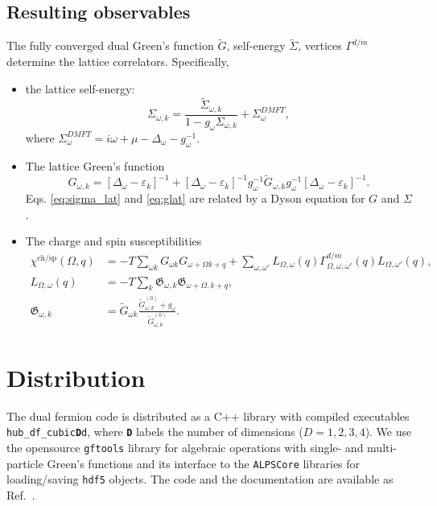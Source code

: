 \documentclass[3p,times,procedia]{elsarticle}
\begin{document}
\subsection{Resulting observables}
The fully converged dual Green's function $\tilde G$, self-energy $\tilde \Sigma$, vertices $\Gamma^{d/m}$ determine the lattice correlators. Specifically, 
\begin{itemize}
\item the lattice self-energy: 
\begin{equation}\label{eq:sigma_lat}
\Sigma_{\omega, k} = \frac{\tilde \Sigma_{\omega, k}}{1 - g_\omega \Sigma_{\omega, k}} + \Sigma^{DMFT}_{\omega},
\end{equation}
where $\Sigma^{DMFT}_{\omega} = i\omega + \mu - \Delta_{\omega} - g_\omega^{-1}$. 
\item The lattice Green's function
\begin{equation}\label{eq:glat}
G_{\omega,k} = \left[\Delta_{\omega} - \varepsilon_{k}\right]^{-1} + \left[\Delta_{\omega} - \varepsilon_{k}\right]^{-1} g_{\omega}^{-1} \tilde G_{\omega, k} g_{\omega}^{-1} \left[\Delta_{\omega} - \varepsilon_{k}\right]^{-1}.
\end{equation}
Eqs. \ref{eq:sigma_lat} and \ref{eq:glat} are related by a Dyson equation for $G$ and $\Sigma$. 
\item The charge and spin susceptibilities
\begin{align}
\chi^{\mathrm{ch/sp}} (\Omega, q) & = -T \sum_{\omega k} G_{\omega k} G_{\omega+\Omega k+q} + \sum_{\omega,\omega'} L_{\Omega, \omega}(q) \Gamma^{d/m}_{\Omega,\omega,\omega'}(q) L_{\Omega, \omega'}(q), \\
L_{\Omega, \omega}(q) & = -T \sum_k \mathfrak{G}_{\omega,k} \mathfrak{G}_{\omega + \Omega,k + q}, \\
\mathfrak{G}_{\omega,k} & = \tilde G_{\omega k} \frac{\tilde G^{(0)}_{\omega, k} + g_\omega}{\tilde G^{(0)}_{\omega, k}}.
\end{align}
\end{itemize}

\section{Distribution}\label{sec:imp}
The dual fermion code is distributed as a C++ library with compiled executables \texttt{hub\_df\_cubic{\bf D}d}, where \texttt{\bf D} labels the number of dimensions ($D=1,2,3,4$). We use the opensource \texttt{gftools} library \cite{gftools} for algebraic operations with single- and multi-particle Green's functions and its interface to the \texttt{ALPSCore} libraries \cite{ALPSCore} for loading/saving \texttt{hdf5} objects. The code and the documentation are available as Ref.~\cite{OpenDFZenodo}.
\end{document}
